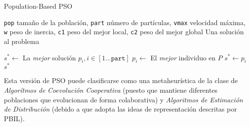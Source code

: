 \begin{algorithm}
\caption{Population-Based PSO}
\label{pbpso-alg}
\begin{algorithmic}[1]

\Require \texttt{pop} tamaño de la población,
	\texttt{part} número de partículas,
	\texttt{vmax} velocidad máxima,
	\texttt{w} peso de inercia,
	\texttt{c1} peso del mejor local,
	\texttt{c2} peso del mejor global
\Ensure Una solución al problema

\EndFor
\State $s^* \gets$ La \emph{mejor} solución $p_i, i \in [1 \dots \texttt{part}]$
			\State $p_i \gets$ El \emph{mejor} individuo en $P$
				\State $s^* \gets p_i$
			\EndIf
		\EndIf
	\EndFor
\EndWhile
\State \Return $s^*$

\end{algorithmic}
\end{algorithm}

Esta versión de PSO puede clasificarse como una metaheurística de la clase de \emph{Algorítmos de Coevolución Cooperativa} \cite{Derrac:2009:FSU:1574827.1574906} (puesto que mantiene diferentes poblaciones que evolucionan de forma colaborativa) y \emph{Algoritmos de Estimación de Distribución} (debido a que adopta las ideas de representación descritas por PBIL).

